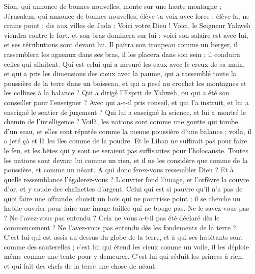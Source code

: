 \begin{multicols}{2}
Sion, qui annonce de bonnes nouvelles, monte sur une haute montagne ; Jérusalem, qui annonce de bonnes nouvelles, élève ta voix avec force ; élève-la, ne crains point ; dis aux villes de Juda : Voici votre Dieu !
Voici, le Seigneur Yahweh viendra contre le fort, et son bras dominera sur lui ; voici son salaire est avec lui, et ses rétributions sont devant lui.
Il paîtra son troupeau comme un berger, il rassemblera les agneaux dans ses bras, il les placera dans son sein ; il conduira celles qui allaitent.
Qui est celui qui a mesuré les eaux avec le creux de sa main, et qui a pris les dimensions des cieux avec la paume, qui a rassemblé toute la poussière de la terre dans un boisseau, et qui a pesé au crochet les montagnes et les collines à la balance ?
Qui a dirigé l'Esprit de Yahweh, ou qui a été son conseiller pour l'enseigner ?
Avec qui a-t-il pris conseil, et qui l'a instruit, et lui a enseigné le sentier de jugement ? Qui lui a enseigné la science, et lui a montré le chemin de l'intelligence ?
Voilà, les nations sont comme une goutte qui tombe d'un seau, et elles sont réputée comme la menue poussière d'une balance ; voila, il a jeté çà et là les îles comme de la poudre.
Et le Liban ne suffirait pas pour faire le feu, et les bêtes qui y sont ne seraient pas suffisantes pour l'holocauste.
Toutes les nations sont devant lui comme un rien, et il ne les considère que comme de la poussière, et comme un néant.
A qui donc ferez-vous ressembler Dieu ? Et à quelle ressemblance l'égalerez-vous ?
L'ouvrier fond l'image, et l'orfèvre la couvre d'or, et y soude des chaînettes d'argent.
Celui qui est si pauvre qu'il n'a pas de quoi faire une offrande, choisit un bois qui ne pourrisse point ; il se cherche un habile ouvrier pour faire une image taillée qui ne bouge pas.
Ne le savez-vous pas ? Ne l'avez-vous pas entendu ? Cela ne vous a-t-il pas été déclaré dès le commencement ? Ne l'avez-vous pas entendu dès les fondements de la terre ?
C'est lui qui est assis au-dessus du globe de la terre, et à qui ses habitants sont comme des sauterelles ; c'est lui qui étend les cieux comme un voile, il les déploie même comme une tente pour y demeurer.
C'est lui qui réduit les princes à rien, et qui fait des chefs de la terre une chose de néant.

\end{multicols}
